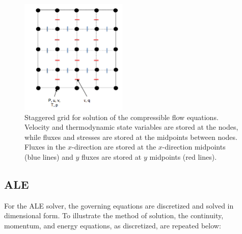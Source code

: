 \documentclass{article}
\begin{document}
\begin{figure}
\centering
\includegraphics[width=2in]{grid}
\caption{\label{fig:grid} Staggered grid for solution of the compressible flow equations. Velocity and thermodynamic state variables are stored at the nodes, while fluxes and stresses are stored at the midpoints between nodes. Fluxes in the $x$-direction are stored at the $x$-direction midpoints (blue lines) and $y$ fluxes are stored at $y$ midpoints (red lines). }
  \end{figure}	
    

\subsection{ALE}

For the ALE solver, the governing equations are discretized and solved in dimensional form.  To illustrate the method of solution, the continuity, momentum, and energy equations, as discretized, are repeated below:
\end{document}

